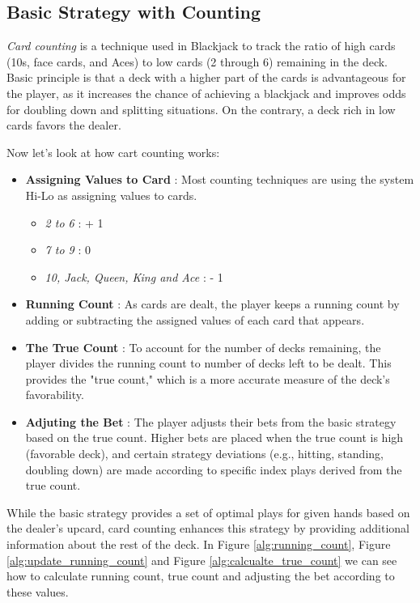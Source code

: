 \documentclass[a4paper,12pt]{report}
\begin{document}
\subsection{Basic Strategy with Counting}
\label{basic_strateg_with_counting}
\textit{Card counting} is a technique used in Blackjack to track the ratio of high cards (10s, face cards, and Aces) to low cards (2 through 6) remaining in the deck. Basic principle is that a deck with a higher part of the cards is advantageous for the player, as it increases the chance of achieving a blackjack and improves odds for doubling down and splitting situations. On the contrary, a deck rich in low cards favors the dealer.

Now let's look at how cart counting works:

\begin{itemize}
    \item \textbf{Assigning Values to Card} : Most counting techniques are using the system Hi-Lo as assigning values to cards.
    \begin{itemize}
        \item \textit{2 to 6} : + 1
        \item \textit{7 to 9} : 0
        \item \textit{10, Jack, Queen, King and Ace} : - 1
    \end{itemize}
    \item \textbf{Running Count} : As cards are dealt, the player keeps a running count by adding or subtracting the assigned values of each card that appears.
    \item \textbf{The True Count} : To account for the number of decks remaining, the player divides the running count to number of decks left to be dealt. This provides the "true count," which is a more accurate measure of the deck's favorability.
    
    \item \textbf{Adjuting the Bet} : The player adjusts their bets from the basic strategy based on the true count. Higher bets are placed when the true count is high (favorable deck), and certain strategy deviations (e.g., hitting, standing, doubling down) are made according to specific index plays derived from the true count.
\end{itemize}

While the basic strategy provides a set of optimal plays for given hands based on the dealer's upcard, card counting enhances this strategy by providing additional information about the rest of the deck. In Figure \ref{alg:running_count}, Figure \ref{alg:update_running_count} and Figure \ref{alg:calcualte_true_count} we can see how to calculate running count, true count and adjusting the bet according to these values.
\end{document}
